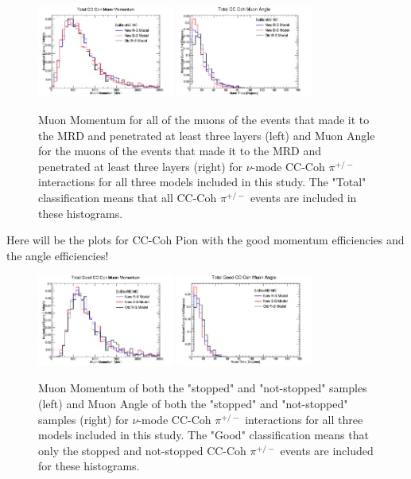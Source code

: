 \documentclass[11pt]{article}
\begin{document}
\begin{figure}[H]
\centering
\includegraphics[width=0.4\textwidth]{CCCohPlots/NMCCCohTotalMomentum.png}
\includegraphics[width=0.4\textwidth]{CCCohPlots/NMCCCohTotalAngle.png}
\caption{Muon Momentum for all of the muons of the events that made it to the MRD and penetrated at least three layers (left) and Muon Angle for the muons of the events that made it to the MRD and penetrated at least three layers (right) for $\nu$-mode CC-Coh $\pi^{+/-}$ interactions for all three models included in this study. The "Total" classification means that all CC-Coh $\pi^{+/-}$ events are included in these histograms.}
\end{figure}\label{fig:NuModeCCCohTotalMomAndAng}

Here will be the plots for CC-Coh Pion with the good momentum efficiencies and the angle efficiencies!

\begin{figure}[H]
\centering
\includegraphics[width=0.4\textwidth]{CCCohPlots/NMCCCohGoodMomentum.png}
\includegraphics[width=0.4\textwidth]{CCCohPlots/NMCCCohGoodAngle.png}
\caption{Muon Momentum of both the "stopped" and "not-stopped" samples (left) and Muon Angle of both the "stopped" and "not-stopped" samples (right) for $\nu$-mode CC-Coh $\pi^{+/-}$ interactions for all three models included in this study. The "Good" classification means that only the stopped and not-stopped CC-Coh $\pi^{+/-}$ events are included for these histograms.}
\end{figure}\label{fig:NuModeCCCohGoodMomAndAng}
\end{document}

